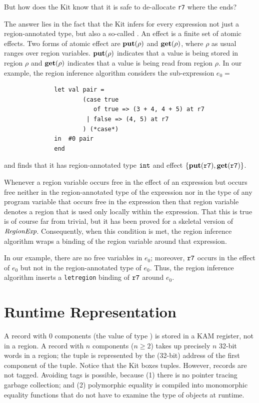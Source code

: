 \documentclass[12pt]{book}
\begin{document}
But how does the Kit know that it is safe to de-allocate {\tt r7}
where the  ends?

The answer lies in the fact that the Kit infers for every expression
not just a region-annotated type, but also a so-called . 
An effect is a finite set of 
atomic effects. Two forms of atomic
effect are $\mathop{\bf put}\nolimits(\rho)$ and $\mathop{\bf get}\nolimits(\rho)$, where $\rho$ as usual ranges
over region variables. $\mathop{\bf put}\nolimits(\rho)$ indicates that a value is being stored in
region $\rho$ and $\mathop{\bf get}\nolimits(\rho)$ indicates that a value is being read from region $\rho$.
In our example, the region inference algorithm considers the sub-expression $e_0 = $
\begin{verbatim}
              let val pair = 
                      (case true 
                         of true => (3 + 4, 4 + 5) at r7 
                       | false => (4, 5) at r7
                      ) (*case*) 
              in  #0 pair
              end  \end{verbatim}
and finds that it has region-annotated type $\hbox{\tt int}$ and effect
$\{\mathop{\bf put}\nolimits(\hbox{\tt r7}), \mathop{\bf get}\nolimits(\hbox{\tt r7})\}$.

Whenever a region variable occurs free in the effect of an expression but occurs
free neither in the region-annotated type of the expression nor in the type of any
program variable that occurs free in the expression then that region variable denotes
a region that is used only locally within the expression.  
That this is true is of course far from trivial, but it
has been proved for a skeletal version of $\hbox{\it RegionExp}$.  Consequently, 
when this condition is met, the region inference
algorithm wraps a  binding of the region variable
around that expression.

In our example, there are no free variables in $e_0$; moreover, $\hbox{\tt r7}$
occurs in the effect of $e_0$ but not in the region-annotated type of $e_0$. Thus,
the region inference algorithm inserts a {\tt letregion} binding of $\hbox{\tt r7}$
around $e_0$.

\section{Runtime Representation}
A record with 0 components (the value of type ) 
is stored in a KAM register, not in a region.
A record with $n$ components ($n\geq 2$) takes up precisely $n$ 32-bit words in a region;
the tuple is represented by the (32-bit) address of the first component of the tuple.
Notice that the Kit boxes tuples.
However, records are not tagged. Avoiding tags is possible, because
(1) there is no pointer tracing garbage collection; and (2) 
polymorphic equality is 
compiled into monomorphic 
equality functions that do not have
to examine the type of objects at runtime. 
\end{document}
